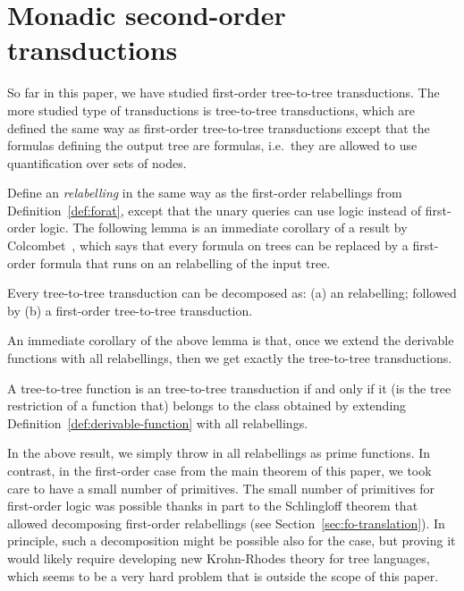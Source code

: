 \section{Monadic second-order transductions}
\label{sec:mso-trans}
So far in this paper, we have studied first-order tree-to-tree transductions. The more studied type of transductions is \mso tree-to-tree transductions, which are defined the same way as first-order tree-to-tree transductions except that the formulas defining the output tree are \mso formulas, i.e.~they are allowed to use quantification over sets of nodes.   

Define an \emph{\mso relabelling} in the same way as the first-order relabellings from Definition~\ref{def:forat}, except that the unary queries can use \mso logic instead of first-order logic.  The following lemma is an immediate corollary of a result by Colcombet~\cite[Corollary 1]{colcombetCombinatorialTheoremTrees2007}, which says that every \mso formula on trees can be replaced by a first-order formula that runs on an \mso relabelling of the input tree. 
\begin{lemma}
    Every \mso tree-to-tree transduction can be decomposed as: (a) an \mso relabelling; followed by (b) a first-order tree-to-tree transduction.
\end{lemma}
An immediate corollary of the above lemma is that, once we extend the derivable functions with all \mso relabellings, then we get exactly the \mso tree-to-tree transductions. 
\begin{theorem}\label{thm:mso-transductions}
    A tree-to-tree function is an \mso tree-to-tree transduction if and only if it (is the tree restriction of a function that)  belongs to the class obtained by extending  Definition~\ref{def:derivable-function} with all \mso relabellings. 
\end{theorem}
In the above result, we simply throw in all \mso relabellings as prime functions. In contrast,  in the first-order case from the main theorem of this paper, we took care to have a small number of primitives. The small number of primitives for first-order logic  was possible thanks in part to the Schlingloff theorem that allowed decomposing first-order relabellings (see Section~\ref{sec:fo-translation}).  In principle, such a decomposition might be possible also for the \mso case, but proving it  would likely require developing new Krohn-Rhodes theory for tree languages, which seems to be a very hard problem that is outside the scope of this paper.

